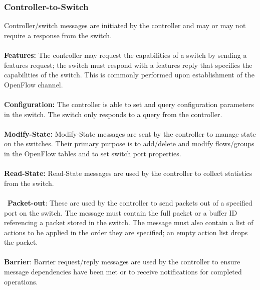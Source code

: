 \documentclass[10pt]{article}
\begin{document}
\subsubsection{Controller-to-Switch}
Controller/switch messages are initiated by the controller and may or may not require a response from the switch.
\\\\
\textbf{Features:}  The controller may request the capabilities of a switch by sending a features request; the switch must respond with a features reply that specifies the capabilities of the switch. This is commonly performed upon establishment of the OpenFlow channel.
\\\\
\textbf{Configuration:} The controller is able to set and query configuration parameters in the switch.  The switch only responds to a query from the controller.
\\\\
\textbf{Modify-State:} Modify-State messages are sent by the controller to manage state on the switches.  Their primary purpose is to add/delete and modify flows/groups in the OpenFlow tables and to set switch port properties.
\\\\
\textbf{Read-State:} Read-State messages are used by the controller to collect statistics from the switch.
\\\\\
\textbf{Packet-out}:  These are used by the controller to send packets out of a specified port on the switch. The message must contain the full packet or a buffer ID referencing a packet stored in the switch. The message must also contain a list of actions to be applied in the order they are specified; an empty action list drops the packet.
\\\\
\textbf{Barrier}: Barrier request/reply messages are used by the controller to ensure message dependencies have been met or to receive notifications for completed operations.  
\end{document}
